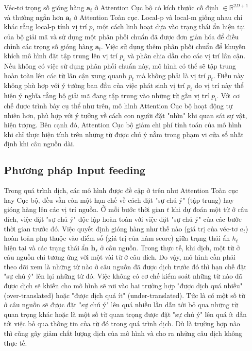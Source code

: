 Véc-tơ trọng số gióng hàng $\bm{a}_t$ ở Attention Cục bộ có kích thước cố định $\in \mathbb{R}^{2D + 1}$ và thường ngắn hơn $\bm{a}_t$ ở Attention Toàn cục. Local-p và local-m giống nhau chỉ khác rằng local-p tính vị trí $p_t$ một cách linh hoạt dựa vào trạng thái ẩn hiện tại của bộ giải mã và sử dụng một phân phối chuẩn đã được đơn giản hóa để điều chỉnh các trọng số gióng hàng $\bm{a}_t$. Việc sử dụng thêm phân phối chuẩn để khuyến khích mô hình đặt tập trung lên vị trí $p_t$ và phân chia dần cho các vị trí lân cận. Nếu không có việc sử dụng phân phối chuẩn này, mô hình có thể sẽ tập trung hoàn toàn lên các từ lân cận xung quanh $p_t$ mà không phải là vị trí $p_t$. Điều này không phù hợp với ý tưởng ban đầu của việc phát sinh vị trí $p_t$ do vị trí này thể hiện ý nghĩa rằng bộ giải mã đang tập trung vào những từ gần vị trí $p_t$.
Với cơ chế được trình bày cụ thể như trên, mô hình Attention Cục bộ hoạt động tự nhiên hơn, phù hợp với ý tưởng về cách con người đặt "nhìn" khi quan sát sự vật, hiện tượng. Bên cạnh đó, Attention Cục bộ giảm chi phí tính toán của mô hình khi chỉ thực hiện tính trên những từ được chú ý nằm trong phạm vi cửa sổ nhất định khi câu nguồn dài.

\subsection{Phương pháp Input feeding}
Trong quá trình dịch, các mô hình được đề cập ở trên như Attention Toàn cục hay Cục bộ, đều vẫn còn một hạn chế về cách đặt "sự chú ý" (tập trung) hay gióng hàng lên các vị trí nguồn. Ở mỗi bước thời gian $t$ khi dự đoán một từ ở câu đích, việc đặt "sự chú ý" độc lập hoàn toàn với việc đặt "sự chú ý" của các bước thời gian trước đó. Việc quyết định gióng hàng như thế nào (giá trị của véc-tơ $a_t$) hoàn toàn phụ thuộc vào điểm số (giá trị của hàm score) giữa trạng thái ẩn $h_t$ hiện tại và các trạng thái ẩn $\bm{h}_s$ ở câu nguồn. Trong thực tế, khi dịch, một từ ở câu nguồn chỉ tương ứng với một vài từ ở câu đích. Do vậy, mô hình cần phải theo dõi xem là những từ nào ở câu nguồn đã được dịch trước đó thì hạn chế đặt "sự chú ý" lên lại những từ đó. Việc không có cơ chế kiểm soát những từ nào đã được dịch sẽ khiến cho mô hình sẽ rơi vào hai trường hợp "được dịch quá nhiều" (over-translated) hoặc "được dịch quá ít" (under-translated). Tức là có một số từ ở câu nguồn sẽ được đặt "sự chú ý" lên quá nhiều lần dẫn tới bỏ qua những từ quan trọng khác hoặc là một số từ quan trọng được đặt "sự chú ý" lên quá ít dẫn tới việc bỏ qua thông tin của từ đó trong quá trình dịch. Dù là trường hợp nào thì cũng gây giảm chất lượng dịch của mô hình và cho ra những câu dịch không thực tế.

